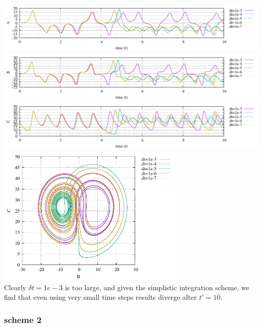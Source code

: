 \begin{center}
\includegraphics[width=16cm]{python_codes/fieldstone_156/results/scheme1/A.pdf}\\
\includegraphics[width=16cm]{python_codes/fieldstone_156/results/scheme1/B.pdf}\\
\includegraphics[width=16cm]{python_codes/fieldstone_156/results/scheme1/C.pdf}\\
\includegraphics[width=9cm]{python_codes/fieldstone_156/results/scheme1/BC.pdf}\\
{\captionfont Clearly $\delta t=1e-3$ is too large, 
and given the simplistic integration scheme, we find that 
even using very small time steps results diverge after $t'=10$.}
\end{center}


\subsubsection*{scheme 2}

